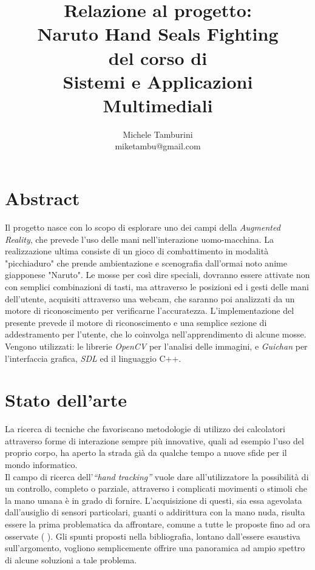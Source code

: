 \documentclass[a4paper,10pt, twocolumn]{article}
\title{Relazione al progetto: \\ Naruto Hand Seals Fighting\\ del corso di\\Sistemi e Applicazioni
Multimediali}
\author{Michele Tamburini \\ miketambu@gmail.com}
\begin{document}
\maketitle

\section{Abstract}
Il progetto nasce con lo scopo di esplorare uno dei campi della \emph{Augmented Reality}, che
prevede l'uso delle mani nell'interazione uomo-macchina.
La realizzazione ultima consiste di un gioco di combattimento in modalità "picchiaduro"
che prende ambientazione e scenografia dall'ormai noto anime giapponese "Naruto".
Le mosse per così dire speciali, dovranno essere attivate non con semplici
combinazioni di tasti, ma attraverso le posizioni ed i gesti delle mani dell'utente,
acquisiti attraverso una webcam, che saranno poi analizzati da un motore di
riconoscimento per verificarne l'accuratezza.
L'implementazione del presente prevede il 
motore di riconoscimento e una semplice sezione di addestramento
per l'utente, che lo coinvolga nell'apprendimento di alcune mosse.\\
Vengono utilizzati: le librerie \emph{OpenCV} per l'analisi delle immagini, e
\emph{Guichan} per l'interfaccia grafica, \emph{SDL} ed il linguaggio C++.

\section{Stato dell'arte}
La ricerca di tecniche che favoriscano metodologie di utilizzo dei calcolatori
attraverso forme di interazione sempre pi\`{u} innovative, quali ad esempio
l'uso del proprio corpo, ha aperto la strada gi\`{a} da qualche tempo
a nuove sfide per il mondo informatico.\\
Il campo di ricerca dell'\emph{``hand tracking''} vuole dare all'utilizzatore
la possibilit\`{a} di un controllo, completo o parziale,
attraverso i complicati movimenti o stimoli che la mano umana \`{e} in grado di fornire.
L'acquisizione di questi, sia essa agevolata dall'ausiglio di sensori particolari,
guanti o addirittura con la mano nuda, risulta essere la prima problematica da affrontare,
comune a tutte le proposte fino ad ora osservate (\cite{handTrackHCI} \cite{handTrackNoMarkers}
 \cite{handNavigator} \cite{hugeSurvey} \cite{mitGlove}). 
 Gli spunti proposti nella bibliografia, lontano
dall'essere esaustiva sull'argomento, vogliono semplicemente offrire una panoramica ad ampio
spettro di alcune soluzioni a tale problema.
\end{document}
